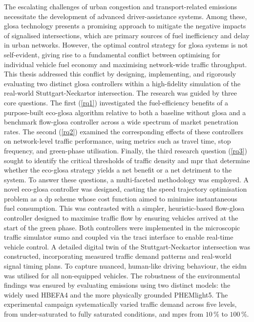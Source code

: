 The escalating challenges of urban congestion and transport-related emissions necessitate the development of advanced driver-assistance systems. Among these, \ac{glosa} technology presents a promising approach to mitigate the negative impacts of signalised intersections, which are primary sources of fuel inefficiency and delay in urban networks. However, the optimal control strategy for \ac{glosa} systems is not self-evident, giving rise to a fundamental conflict between optimising for individual vehicle fuel economy and maximising network-wide traffic throughput. This thesis addressed this conflict by designing, implementing, and rigorously evaluating two distinct \ac{glosa} controllers within a high-fidelity simulation of the real-world Stuttgart-Neckartor intersection.
\mynewline
The research was guided by three core questions. The first (\ref{rq1}) investigated the fuel-efficiency benefits of a purpose-built \ac{eco-glosa} algorithm relative to both a baseline without \ac{glosa} and a benchmark \ac{flow-glosa} controller across a wide spectrum of market penetration rates. The second (\ref{rq2}) examined the corresponding effects of these controllers on network-level traffic performance, using metrics such as travel time, stop frequency, and green-phase utilisation. Finally, the third research question (\ref{rq3}) sought to identify the critical thresholds of traffic density and \ac{mpr} that determine whether the \ac{eco-glosa} strategy yields a net benefit or a net detriment to the system.
\mynewline
To answer these questions, a multi-faceted methodology was employed. A novel \ac{eco-glosa} controller was designed, casting the speed trajectory optimisation problem as a \ac{dp} scheme whose cost function aimed to minimise instantaneous fuel consumption. This was contrasted with a simpler, heuristic-based \ac{flow-glosa} controller designed to maximise traffic flow by ensuring vehicles arrived at the start of the green phase. Both controllers were implemented in the microscopic traffic simulator \ac{sumo} and coupled via the \ac{traci} interface to enable real-time vehicle control. A detailed digital twin of the Stuttgart-Neckartor intersection was constructed, incorporating measured traffic demand patterns and real-world signal timing plans. To capture nuanced, human-like driving behaviour, the \ac{eidm} was utilised for all non-equipped vehicles. The robustness of the environmental findings was ensured by evaluating emissions using two distinct models: the widely used HBEFA4 and the more physically grounded PHEMlight5. The experimental campaign systematically varied traffic demand across five levels, from under-saturated to fully saturated conditions, and \acp{mpr} from $10\,\%$ to $100\,\%$.
